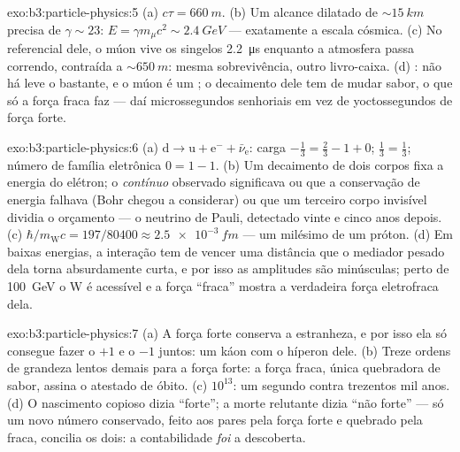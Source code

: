 \begin{solution}{exo:b3:particle-physics:5}
(a) $c\tau = \qty{660}{m}$. (b) Um alcance dilatado de
${\sim}\qty{15}{km}$ precisa de $\gamma \sim 23$: $E = \gamma
m_\mu c^2 \sim \qty{2.4}{GeV}$ --- exatamente a escala cósmica. (c)
No referencial dele, o múon vive os singelos \qty{2.2}{\micro s}
enquanto a atmosfera passa correndo, contraída a
${\sim}\qty{650}{m}$: mesma sobrevivência, outro livro-caixa. (d) : não há  leve o bastante, e o múon é um
; o decaimento dele tem de mudar sabor, o que só a força fraca
faz --- daí microssegundos senhoriais em vez de yoctossegundos de
força forte.
\end{solution}

\begin{solution}{exo:b3:particle-physics:6}
(a) $\text{d} \to \text{u} + \text{e}^- + \bar\nu_{\text{e}}$:
carga $-\tfrac13 = \tfrac23 - 1 + 0$; 
$\tfrac13 = \tfrac13$; número de família eletrônica $0 = 1 - 1$. (b) Um
decaimento de dois corpos fixa a energia do elétron; o
\emph{contínuo} observado significava ou que a conservação de energia
falhava (Bohr chegou a considerar) ou que um terceiro corpo invisível
dividia o orçamento --- o neutrino de Pauli, detectado vinte e cinco anos
depois. (c) $\hbar/m_{\text{W}}c = 197/80400 \approx
\qty{2.5e-3}{fm}$ --- um milésimo de um próton. (d) Em baixas
energias, a interação tem de vencer uma distância que o mediador pesado
dela torna absurdamente curta, e por isso as amplitudes são minúsculas;
perto de \qty{100}{GeV} o W é acessível e a força ``fraca'' mostra
a verdadeira força eletrofraca dela.
\end{solution}

\begin{solution}{exo:b3:particle-physics:7}
(a) A força forte conserva a estranheza, e por isso ela só consegue fazer
o $+1$ e o $-1$ juntos: um káon com o híperon dele. (b) Treze
ordens de grandeza lentos demais para a força forte: a força
fraca, única quebradora de sabor, assina o atestado de óbito.
(c) $10^{13}$: um segundo contra trezentos mil anos.
(d) O nascimento copioso dizia ``forte''; a morte relutante dizia ``não
forte'' --- só um novo número conservado, feito aos pares pela força
forte e quebrado pela fraca, concilia os dois: a
contabilidade \emph{foi} a descoberta.
\end{solution}

